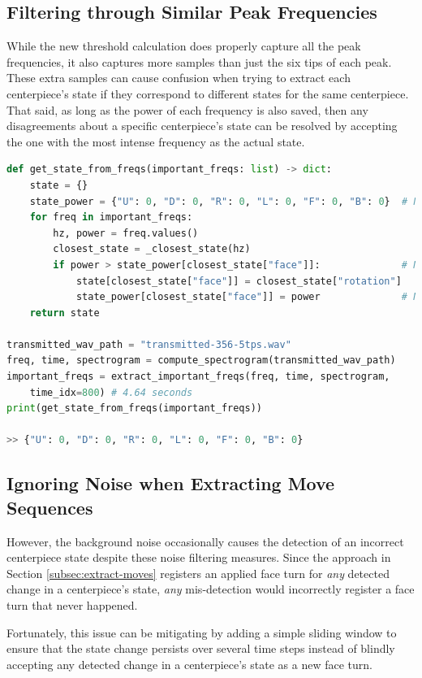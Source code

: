 \subsection{Filtering through Similar Peak Frequencies}
\label{subsec:filtering-similar-peak-frequencies}
While the new threshold calculation does properly capture all the peak frequencies, it also captures more samples than just the six tips of each peak. 
These extra samples can cause confusion when trying to extract each centerpiece's state if they correspond to different states for the same centerpiece.
That said, as long as the power of each frequency is also saved, then any disagreements about a specific centerpiece's state can be resolved by accepting the one with the most intense frequency as the actual state.

\begin{lstlisting}[language=Python]
def get_state_from_freqs(important_freqs: list) -> dict:
    state = {}
    state_power = {"U": 0, "D": 0, "R": 0, "L": 0, "F": 0, "B": 0}  # New
    for freq in important_freqs:
        hz, power = freq.values()
        closest_state = _closest_state(hz)
        if power > state_power[closest_state["face"]]:              # New
            state[closest_state["face"]] = closest_state["rotation"]
            state_power[closest_state["face"]] = power              # New
    return state

transmitted_wav_path = "transmitted-356-5tps.wav"
freq, time, spectrogram = compute_spectrogram(transmitted_wav_path)
important_freqs = extract_important_freqs(freq, time, spectrogram,
    time_idx=800) # 4.64 seconds
print(get_state_from_freqs(important_freqs))

>> {"U": 0, "D": 0, "R": 0, "L": 0, "F": 0, "B": 0}
\end{lstlisting}

\newpage
\subsection{Ignoring Noise when Extracting Move Sequences}
\label{subsec:ignoring-noise-when-extracting-move-sequences}
However, the background noise occasionally causes the detection of an incorrect centerpiece state despite these noise filtering measures.
Since the approach in Section \ref{subsec:extract-moves} registers an applied face turn for \emph{any} detected change in a centerpiece's state, \emph{any} mis-detection would incorrectly register a face turn that never happened.

Fortunately, this issue can be mitigating by adding a simple sliding window to ensure that the state change persists over several time steps instead of blindly accepting any detected change in a centerpiece's state as a new face turn.

